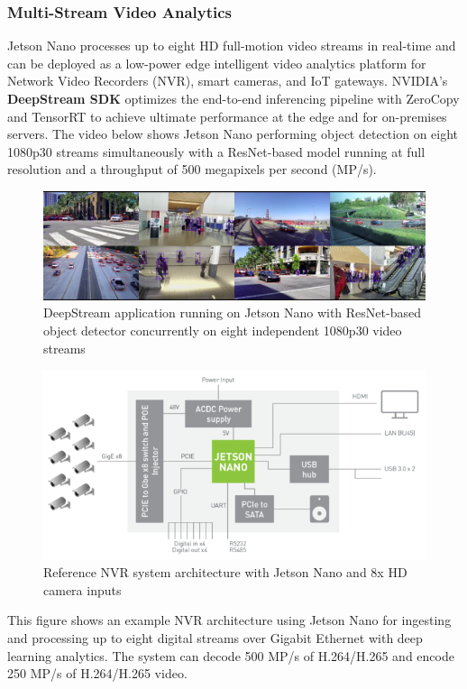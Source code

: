         \subsubsection{Multi-Stream Video Analytics}
            Jetson Nano processes up to eight HD full-motion video streams in real-time and can be deployed as a low-power edge intelligent video analytics platform for Network Video Recorders (NVR), 
            smart cameras, and IoT gateways. NVIDIA’s \textbf{DeepStream SDK} optimizes the end-to-end inferencing pipeline with ZeroCopy and TensorRT to achieve ultimate performance at the edge and for on-premises 
            servers. The video below shows Jetson Nano performing object detection on eight 1080p30 streams simultaneously with a ResNet-based model running at full resolution and a throughput of 500 
            megapixels per second (MP/s).
            \begin{figure}[H]
                \centering
                \includegraphics[width=0.6\linewidth]{img/deep-stream.png}
                \caption{DeepStream application running on Jetson Nano with ResNet-based object detector concurrently on eight independent 1080p30 video streams}
            \end{figure}
            \begin{figure}[H]
                \centering
                \includegraphics[width=0.6\linewidth]{img/NVR.png}
                \caption{Reference NVR system architecture with Jetson Nano and 8x HD camera inputs}
            \end{figure}
            This figure shows an example NVR architecture using Jetson Nano for ingesting and processing up to eight digital streams over Gigabit Ethernet with deep learning analytics. The system can decode 500 MP/s 
            of H.264/H.265 and encode 250 MP/s of H.264/H.265 video.

